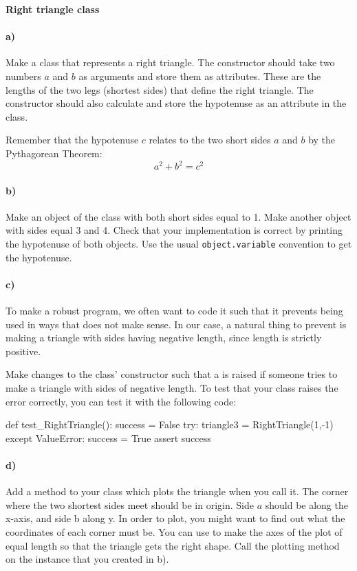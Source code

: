 \begin{Problem}{\textbf{Right triangle class}}
\paragraph{a)}
Make a class  that represents a right triangle. The constructor  should take two numbers $a$ and $b$ as arguments and store them as
attributes. These are the lengths of the two legs (shortest sides) that define the right triangle. The constructor should also calculate and store the hypotenuse as an attribute in the class.

Remember that the hypotenuse $c$ relates to the two short sides $a$ and $b$ by the Pythagorean Theorem:
\begin{equation*}
    a^2 + b^2 = c^2
\end{equation*}

\paragraph{b)}
Make an object  of the class   with both short sides equal to 1. Make another object  with sides equal 3 and 4. Check that your implementation is correct by printing the hypotenuse of both objects. Use the usual \texttt{object.variable} convention to get the hypotenuse.

\paragraph{c)}
To make a robust program, we often want to code it such that it prevents
being used in ways that does not make sense. In our case, a natural thing
to prevent is making a triangle with sides having negative length, since length is strictly positive.

Make changes to the class' constructor such that a  is
raised if someone tries to make a triangle with sides of negative length.
To test that your class raises the error correctly, you can test it with the following code:

\begin{python}
def test_RightTriangle():
    success = False
    try:
        triangle3 = RightTriangle(1,-1)
    except ValueError:
        success = True
    assert success
\end{python}

\paragraph{d)}
Add a method  to your class which plots the triangle
when you call it. The corner where the two shortest sides meet should be in origin.
Side $a$ should be along the x-axis, and side b along y. In order to plot, you
might want to find out what the coordinates of each corner must be. You can use
 to make the axes of the plot of equal length so
that the triangle gets the right shape. Call the plotting method on the
instance  that you created in b).


\end{Problem}
